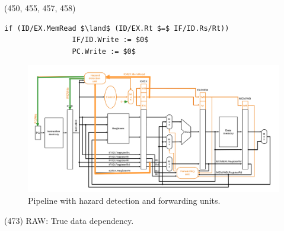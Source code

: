\begin{theorem}{(450, 455, 457, 458)}
\begin{itemize}
\begin{lstlisting}[caption={Stall.}, captionpos=b, mathescape=true, language={[x86masm]Assembler}]
            if (ID/EX.MemRead $\land$ (ID/EX.Rt $=$ IF/ID.Rs/Rt))
                IF/ID.Write := $0$
                PC.Write := $0$
        \end{lstlisting}
        \begin{figure}[H]
            \centering
            \includegraphics[scale=0.3]{img/pipeline-hazard.png}
            \caption{Pipeline with hazard detection and forwarding units.}
            \label{img:pipeline-hazard}
        \end{figure}
    \end{itemize}
\end{theorem}

\item \begin{theorem}{(473)} RAW: True data dependency.
\end{theorem}

